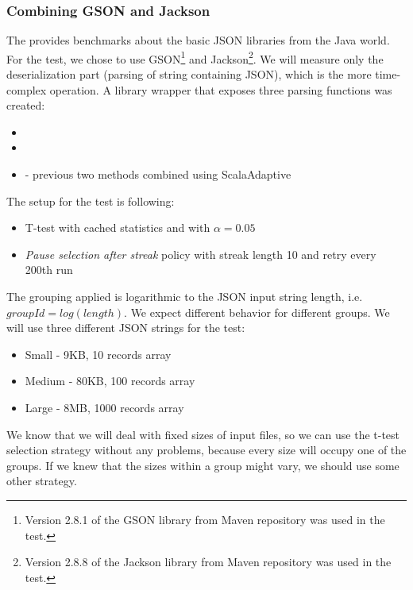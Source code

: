 \subsubsection{Combining GSON and Jackson}

The \cite{dreyfuss_ultimate_2015} provides benchmarks about the basic JSON libraries from the Java world. For the test, we chose to use GSON\footnote{Version 2.8.1 of the GSON library from Maven repository was used in the test.} and Jackson\footnote{Version 2.8.8 of the Jackson library from Maven repository was used in the test.}. We will measure only the deserialization part (parsing of string containing JSON), which is the more time-complex operation. A library wrapper that exposes three parsing functions was created:
\begin{itemize}
	\item {}
	\item {}
	\item {} - previous two methods combined using ScalaAdaptive
\end{itemize}

The setup for the test is following:
\begin{itemize}
	\item T-test with cached statistics and with $\alpha = 0.05$
	\item \textit{Pause selection after streak} policy with streak length 10 and retry every 200th run
\end{itemize}

The grouping applied is logarithmic to the JSON input string length, i.e. $groupId = log(length)$. We expect different behavior for different groups. We will use three different JSON strings for the test:

\begin{itemize}
	\item Small - 9KB, 10 records array
	\item Medium - 80KB, 100 records array
	\item Large - 8MB, 1000 records array
\end{itemize}

We know that we will deal with fixed sizes of input files, so we can use the t-test selection strategy without any problems, because every size will occupy one of the groups. If we knew that the sizes within a group might vary, we should use some other strategy.


